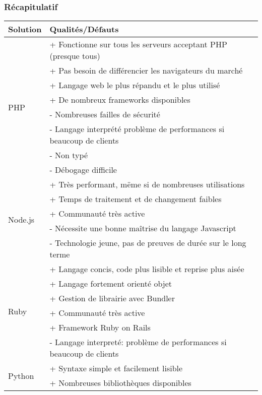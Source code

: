         \subsubsection{Récapitulatif}
        \label{recap}
        \begin{tabular}{|l|l|}
            \hline
            Solution & Qualités/Défauts \\ \hline
            \multirow{8}{*}{PHP} & + Fonctionne sur tous les serveurs acceptant PHP (presque tous) \\
                & + Pas besoin de différencier les navigateurs du marché \\
                & + Langage web le plus répandu et le plus utilisé \\
                & + De nombreux frameworks disponibles \\
                & - Nombreuses failles de sécurité \\
                & - Langage interprété problème de performances si beaucoup de clients \\
                & - Non typé \\
                & - Débogage difficile \\ \hline
            \multirow{5}{*}{Node.js} & + Très performant, mëme si de nombreuses utilisations \\
                & + Temps de traitement et de changement faibles \\
                & + Communauté très active \\
                & - Nécessite une bonne maîtrise du langage Javascript \\
                & - Technologie jeune, pas de preuves de durée sur le long terme \\ \hline
            \multirow{6}{*}{Ruby} & + Langage concis, code plus lisible et reprise plus aisée \\
                & + Langage fortement orienté objet \\
                & + Gestion de librairie avec Bundler \\
                & + Communauté très active \\
                & + Framework Ruby on Rails \\
                & - Langage interpreté: problème de performances si beaucoup de clients \\ \hline
            \multirow{6}{*}{Python} & + Syntaxe simple et facilement lisible \\
                & + Nombreuses bibliothèques disponibles \\

\end{tabular}
